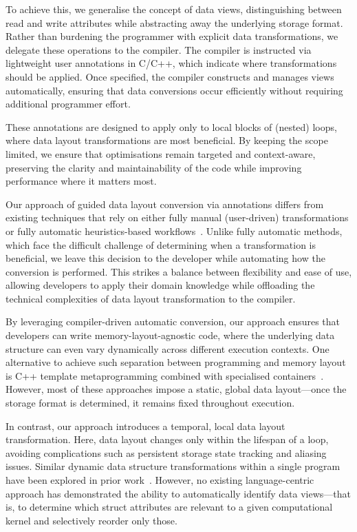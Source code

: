 To achieve this, we generalise the concept of data views, distinguishing between read and write attributes while abstracting away the underlying storage format. Rather than burdening the programmer with explicit data transformations, we delegate these operations to the compiler. The compiler is instructed via lightweight user annotations in C/C++, which indicate where transformations should be applied. Once specified, the compiler constructs and manages views automatically, ensuring that data conversions occur efficiently without requiring additional programmer effort.

These annotations are designed to apply only to local blocks of (nested) loops, where data layout transformations are most beneficial. By keeping the scope limited, we ensure that optimisations remain targeted and context-aware, preserving the clarity and maintainability of the code while improving performance where it matters most.

Our approach of guided data layout conversion via annotations differs from existing techniques that rely on either fully manual (user-driven) transformations or fully automatic heuristics-based workflows~\cite{Jubertie:2018:DataLayoutAbstractionLayers,Xu:2014:SemiAutomaticComposition}. Unlike fully automatic methods, which face the difficult challenge of determining when a transformation is beneficial, we leave this decision to the developer while automating how the conversion is performed. This strikes a balance between flexibility and ease of use, allowing developers to apply their domain knowledge while offloading the technical complexities of data layout transformation to the compiler.

By leveraging compiler-driven automatic conversion, our approach ensures that developers can write memory-layout-agnostic code, where the underlying data structure can even vary dynamically across different execution contexts. One alternative to achieve such separation between programming and memory layout is C++ template metaprogramming combined with specialised containers~\cite{Homann:2018:SoAx,Reinders:2016:XeonPhi,Jubertie:2018:DataLayoutAbstractionLayers,Springer:2018:SoALayout,Strzodka:2011:AbstractionSoA}. However, most of these approaches impose a static, global data layout—once the storage format is determined, it remains fixed throughout execution.

In contrast, our approach introduces a temporal, local data layout transformation. Here, data layout changes only within the lifespan of a loop, avoiding complications such as persistent storage state tracking and aliasing issues. Similar dynamic data structure transformations within a single program have been explored in prior work~\cite{Gallard:2020:ExaHyPEVectorisation,Vikram:2014:LLVM}. However, no existing language-centric approach has demonstrated the ability to automatically identify data views—that is, to determine which struct attributes are relevant to a given computational kernel and selectively reorder only those.


